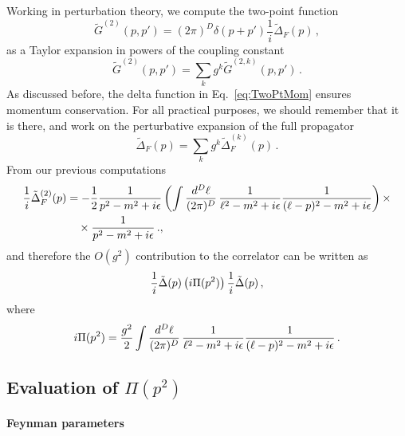 Working in perturbation theory, we compute the two-point function
\begin{equation}
  \label{eq:TwoPtMom}
  \tilde{G}^{(2)}\left(p,p'\right) =
  (2\pi)^D \delta\left(p+p'\right) \frac{1}{i} \tilde{\Delta}_F(p)\, ,
\end{equation}
as a Taylor expansion in powers of the coupling constant
\begin{equation}
  \label{eq:TwoPtMomPert}
  \tilde{G}^{(2)}\left(p,p'\right) = \sum_k g^k
  \tilde{G}^{(2,k)}\left(p,p'\right)\, .
\end{equation}
As discussed before, the delta function in Eq.~\ref{eq:TwoPtMom}
ensures momentum conservation. For all practical purposes, we should
remember that it is there, and work on the perturbative expansion of
the full propagator 
\begin{equation}
  \label{eq:PropMomPert}
  \tilde{\Delta}_F(p) = \sum_k g^k \tilde{\Delta}^{(k)}_F(p)\, .
\end{equation}
From our previous computations
\begin{align}
   \frac{1}{i} \tilde{\Delta}_F^{(2)}(p)
  &= -\frac{1}{2} \frac{1}{p^2-m^2+i\epsilon} \left(\int \frac{d^D\ell}{(2\pi)^D}\,
    \frac{1}{\ell^2-m^2+i\epsilon} \frac{1}{(\ell-p)^2-m^2+i\epsilon}\right) \times \nonumber \\
  &\quad \times \frac{1}{p^2-m^2+i\epsilon}\, .,
\end{align}
and therefore the $O(g^2)$ contribution to the correlator can be
written as
\begin{equation}
  \label{eq:OneLoopPi}
  \frac{1}{i} \tilde{\Delta}(p) \left(i\Pi(p^2)\right) \frac{1}{i}
  \tilde{\Delta}(p)\, ,
\end{equation}
where
\begin{equation}
  \label{eq:PiFun}
  i\Pi(p^2) = \frac{g^2}{2} \int  \frac{d^D\ell}{(2\pi)^D}\,
  \frac{1}{\ell^2-m^2+i\epsilon} \frac{1}{(\ell-p)^2-m^2+i\epsilon}\, .
\end{equation}

\subsection{Evaluation of $\Pi(p^2)$}
\label{sec:evaluation-pi}

\paragraph{Feynman parameters}

